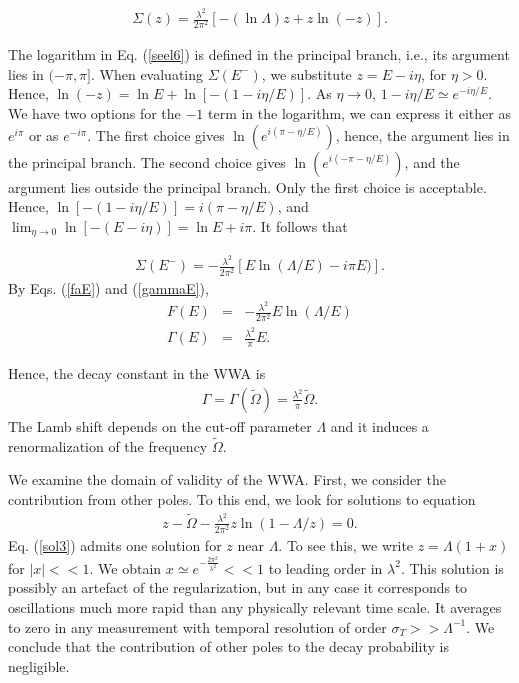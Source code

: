 \documentclass[12pt]{article}
\numberwithin{equation}{section}
\begin{document}
      \begin{eqnarray}
   \Sigma (z) =   \frac{\lambda^2  }{2 \pi^2} \left[ -  (\ln\Lambda) z  + z \ln (-z) \right]. \label{seel6}
  \end{eqnarray}

   The logarithm in Eq. (\ref{seel6}) is defined in the principal branch,  i.e., its argument lies in  $(-\pi, \pi]$. When evaluating $\Sigma(E^-)$, we substitute $z = E - i \eta$, for $\eta > 0$. Hence, $\ln(-z) = \ln E + \ln[-(1-i\eta/E)]$. As $\eta \rightarrow 0$,  $1-i\eta/E \simeq e^{-i\eta/E}$. We have two options for the $-1$ term in the logarithm, we can express it either as $e^{i \pi}$ or as $e^{-i \pi}$. The first choice gives $\ln (e^{i (\pi-\eta/E)})$, hence, the argument lies in the principal branch. The second choice gives $\ln (e^{i (-\pi-\eta/E)})$, and the argument lies outside the principal branch. Only the first choice is acceptable. Hence, $\ln[-(1-i\eta/E)] = i(\pi-\eta/E)$, and  $\lim_{\eta \rightarrow 0} \ln[-(E-i\eta)] = \ln E + i \pi$. It follows that

\begin{eqnarray}
\Sigma(E^-) = - \frac{\lambda^2}{2 \pi^2} \left[  E \ln(\Lambda/E) - i \pi E ) \right].
\end{eqnarray}
By Eqs. (\ref{faE}) and (\ref{gammaE}),
\begin{eqnarray}
F(E) &=& - \frac{\lambda^2}{2 \pi^2}     E \ln(\Lambda/E)   \\
\Gamma(E) &=& \frac{\lambda^2}{ \pi}E.  \label{gammaE2}
\end{eqnarray}


Hence, the decay constant in the WWA is
\begin{eqnarray}
\Gamma = \Gamma(\tilde{\Omega}) = \frac{\lambda^2}{ \pi}\tilde{\Omega}.
\end{eqnarray}
The Lamb shift depends on the cut-off parameter $\Lambda$ and it induces a renormalization of the frequency $\tilde{\Omega}$.


\bigskip

We examine the domain of validity of the WWA. First, we consider the contribution from other poles. To this end, we look for solutions to equation
 \begin{eqnarray}
 z - \tilde{\Omega} - \frac{\lambda^2}{2 \pi^2} z \ln(1 - \Lambda/z) = 0.  \label{sol3}
 \end{eqnarray}
 Eq. (\ref{sol3}) admits one solution  for $z$ near  $\Lambda$. To see this, we write $z = \Lambda ( 1 +x)$ for $|x| << 1$. We obtain
$x   \simeq  e^{-\frac{2\pi^2}{\lambda^2}} << 1$ to leading order in $\lambda^2$.  This solution is possibly an artefact of the regularization, but in any case it corresponds to oscillations much more rapid than any physically relevant time scale. It averages to zero in any measurement with  temporal resolution of order $\sigma_T >> \Lambda^{-1}$. We conclude that the contribution of other poles to the decay probability is negligible.
\end{document}
